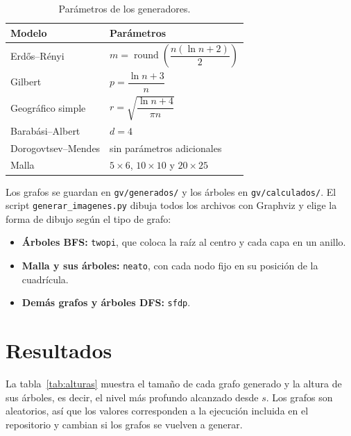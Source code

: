 \documentclass[11pt,letterpaper]{article}
\begin{document}
\begin{table}[H]
\centering
\begin{tabular}{ll}
\toprule
Modelo & Parámetros \\
\midrule
Erd\H{o}s--Rényi & $m = \operatorname{round}\!\left(\dfrac{n(\ln n + 2)}{2}\right)$ \\[10pt]
Gilbert & $p = \dfrac{\ln n + 3}{n}$ \\[10pt]
Geográfico simple & $r = \sqrt{\dfrac{\ln n + 4}{\pi n}}$ \\[10pt]
Barabási--Albert & $d = 4$ \\[4pt]
Dorogovtsev--Mendes & sin parámetros adicionales \\[4pt]
Malla & $5 \times 6$, $10 \times 10$ y $20 \times 25$ \\
\bottomrule
\end{tabular}
\caption{Parámetros de los generadores.}
\end{table}

Los grafos se guardan en \texttt{gv/generados/} y los árboles en
\texttt{gv/calculados/}. El script \texttt{generar\_imagenes.py} dibuja todos los
archivos con Graphviz y elige la forma de dibujo según el tipo de grafo:

\begin{itemize}
    \item \textbf{Árboles BFS:} \texttt{twopi}, que coloca la raíz al centro y cada
          capa en un anillo.
    \item \textbf{Malla y sus árboles:} \texttt{neato}, con cada nodo fijo en su
          posición de la cuadrícula.
    \item \textbf{Demás grafos y árboles DFS:} \texttt{sfdp}.
\end{itemize}

\section{Resultados}

La tabla~\ref{tab:alturas} muestra el tamaño de cada grafo generado y la altura de
sus árboles, es decir, el nivel más profundo alcanzado desde $s$. Los grafos son
aleatorios, así que los valores corresponden a la ejecución incluida en el
repositorio y cambian si los grafos se vuelven a generar.
\end{document}
